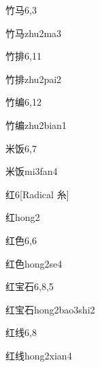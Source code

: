 \begin{entry}{竹马}{6,3}
  \begin{phonetics}{竹马}{zhu2ma3}
  \end{phonetics}
\end{entry}

\begin{entry}{竹排}{6,11}
  \begin{phonetics}{竹排}{zhu2pai2}
  \end{phonetics}
\end{entry}

\begin{entry}{竹编}{6,12}
  \begin{phonetics}{竹编}{zhu2bian1}
  \end{phonetics}
\end{entry}

\begin{entry}{米饭}{6,7}
  \begin{phonetics}{米饭}{mi3fan4}
  \end{phonetics}
\end{entry}

\begin{entry}{红}{6}[Radical 糸]
  \begin{phonetics}{红}{hong2}
  \end{phonetics}
\end{entry}

\begin{entry}{红色}{6,6}
  \begin{phonetics}{红色}{hong2se4}
  \end{phonetics}
\end{entry}

\begin{entry}{红宝石}{6,8,5}
  \begin{phonetics}{红宝石}{hong2bao3shi2}
  \end{phonetics}
\end{entry}

\begin{entry}{红线}{6,8}
  \begin{phonetics}{红线}{hong2xian4}
  \end{phonetics}
\end{entry}

